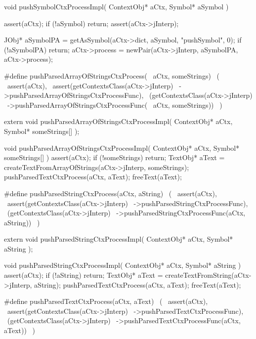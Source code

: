 \startCCode
void pushSymbolCtxProcessImpl(
  ContextObj* aCtx,
  Symbol* aSymbol
) {
  assert(aCtx);
  if (!aSymbol) return;
  assert(aCtx->jInterp);

  JObj* aSymbolPA = getAsSymbol(aCtx->dict, aSymbol, "pushSymbol", 0);
  if (!aSymbolPA) return;
  aCtx->process = newPair(aCtx->jInterp, aSymbolPA, aCtx->process);
}
\stopCCode

\startCHeader
#define pushParsedArrayOfStringsCtxProcess(      \
  aCtx, someStrings)                             \
  (                                              \
    assert(aCtx),                                \
    assert(getContextsClass(aCtx->jInterp)       \
      ->pushParsedArrayOfStringsCtxProcessFunc), \
    (getContextsClass(aCtx->jInterp)             \
      ->pushParsedArrayOfStringsCtxProcessFunc(  \
        aCtx, someStrings))                      \
  )
\stopCHeader

\setCHeaderStream{private}
\startCHeader
extern void pushParsedArrayOfStringsCtxProcessImpl(
  ContextObj* aCtx,
  Symbol* someStrings[]
);
\stopCHeader
{}

\startCCode
void pushParsedArrayOfStringsCtxProcessImpl(
  ContextObj* aCtx,
  Symbol* someStrings[]
) {
  assert(aCtx);
  if (!someStrings) return;
  TextObj* aText =
    createTextFromArrayOfStrings(aCtx->jInterp, someStrings);
  pushParsedTextCtxProcess(aCtx, aText);
  freeText(aText);
}
\stopCCode

\startCHeader
#define pushParsedStringCtxProcess(aCtx, aString)      \
  (                                                    \
    assert(aCtx),                                      \
    assert(getContextsClass(aCtx->jInterp)             \
      ->pushParsedStringCtxProcessFunc),               \
    (getContextsClass(aCtx->jInterp)                   \
      ->pushParsedStringCtxProcessFunc(aCtx, aString)) \
  )
\stopCHeader

\setCHeaderStream{private}
\startCHeader
extern void pushParsedStringCtxProcessImpl(
  ContextObj* aCtx,
  Symbol* aString
);
\stopCHeader
\setCHeaderStream{public}

\startCCode
void pushParsedStringCtxProcessImpl(
  ContextObj* aCtx,
  Symbol* aString
) {
  assert(aCtx);
  if (!aString) return;
  TextObj* aText =
    createTextFromString(aCtx->jInterp, aString);
  pushParsedTextCtxProcess(aCtx, aText);
  freeText(aText);
}
\stopCCode

\startCHeader
#define pushParsedTextCtxProcess(aCtx, aText)      \
  (                                                \
    assert(aCtx),                                  \
    assert(getContextsClass(aCtx->jInterp)         \
      ->pushParsedTextCtxProcessFunc),             \
    (getContextsClass(aCtx->jInterp)               \
      ->pushParsedTextCtxProcessFunc(aCtx, aText)) \
  )
\stopCHeader

